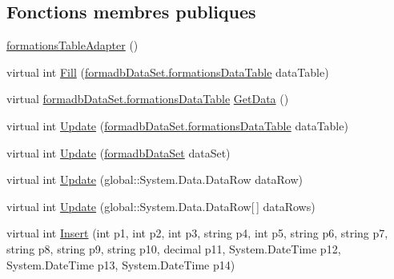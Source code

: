 \subsection*{Fonctions membres publiques}
\begin{DoxyCompactItemize}
\item 
\hyperlink{classforma_1_1formadb_data_set_table_adapters_1_1formations_table_adapter_a08841923a453444006b08e793ca2204b}{formations\+Table\+Adapter} ()
\item 
virtual int \hyperlink{classforma_1_1formadb_data_set_table_adapters_1_1formations_table_adapter_abb3c2798ee2a3ed973163ac66a324219}{Fill} (\hyperlink{classforma_1_1formadb_data_set_1_1formations_data_table}{formadb\+Data\+Set.\+formations\+Data\+Table} data\+Table)
\item 
virtual \hyperlink{classforma_1_1formadb_data_set_1_1formations_data_table}{formadb\+Data\+Set.\+formations\+Data\+Table} \hyperlink{classforma_1_1formadb_data_set_table_adapters_1_1formations_table_adapter_ae6f0a62d5f59b5d9d8dda05c60c212f0}{Get\+Data} ()
\item 
virtual int \hyperlink{classforma_1_1formadb_data_set_table_adapters_1_1formations_table_adapter_ac324c19da36a5bf42b1cc376e18f9467}{Update} (\hyperlink{classforma_1_1formadb_data_set_1_1formations_data_table}{formadb\+Data\+Set.\+formations\+Data\+Table} data\+Table)
\item 
virtual int \hyperlink{classforma_1_1formadb_data_set_table_adapters_1_1formations_table_adapter_a5a535f46d4f427dc11835f7f0983e647}{Update} (\hyperlink{classforma_1_1formadb_data_set}{formadb\+Data\+Set} data\+Set)
\item 
virtual int \hyperlink{classforma_1_1formadb_data_set_table_adapters_1_1formations_table_adapter_a62ef395b9de47c368b14959ef14af80d}{Update} (global\+::\+System.\+Data.\+Data\+Row data\+Row)
\item 
virtual int \hyperlink{classforma_1_1formadb_data_set_table_adapters_1_1formations_table_adapter_a44197096c9da59fa7afbeeff44027a44}{Update} (global\+::\+System.\+Data.\+Data\+Row\mbox{[}$\,$\mbox{]} data\+Rows)
\item 
virtual int \hyperlink{classforma_1_1formadb_data_set_table_adapters_1_1formations_table_adapter_a1ce5c8afbf363a646a36c2748b07ebd0}{Insert} (int p1, int p2, int p3, string p4, int p5, string p6, string p7, string p8, string p9, string p10, decimal p11, System.\+Date\+Time p12, System.\+Date\+Time p13, System.\+Date\+Time p14)
\end{DoxyCompactItemize}
